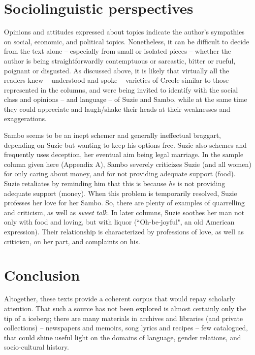 \documentclass[output=paper,colorlinks,citecolor=brown]{langscibook}
\begin{document}
 
\section{Sociolinguistic perspectives}

Opinions and attitudes expressed about topics indicate the author’s sympathies on social, economic, and political topics.  Nonetheless, it can be difficult to decide from the text alone – especially from small or isolated pieces – whether the author is being straightforwardly contemptuous or sarcastic, bitter or rueful, poignant or disgusted.  As discussed above, it is likely  that virtually all the readers knew – understood and spoke – varieties of Creole similar to those represented in the columns, and were being invited to identify with the social class and opinions – and language – of Suzie and Sambo, while at the same time they could appreciate and laugh/shake their heads at their weaknesses and exaggerations.  

Sambo seems to be an inept schemer and generally ineffectual braggart, depending on Suzie but wanting to keep his options free.  Suzie also schemes and frequently uses deception, her eventual aim being legal marriage. In the sample column given here (Appendix A), Sambo severely criticizes Suzie (and all women) for only caring about money, and for not providing adequate support (food).  Suzie retaliates by reminding him that this is because \textit{he} is not providing adequate support (money).  When this problem is temporarily resolved, Suzie professes her love for her Sambo.  So, there are plenty of examples of quarrelling and criticism, as well as \textit{sweet talk}.  In later columns, Suzie soothes her man not only with food and loving, but with liquor (``Oh-be-joyful", an old American expression).  Their relationship is characterized by professions of love, as well as criticism, on her part, and complaints on his.  


\section{Conclusion}


Altogether, these texts provide a coherent corpus that would repay scholarly attention.   That such a source has not been explored is almost certainly only the tip of a iceberg; there are many materials in archives and libraries (and private collections) – newspapers and memoirs, song lyrics and recipes – few catalogued, that could shine useful light on the domains of language, gender relations, and socio-cultural history.
\end{document}

